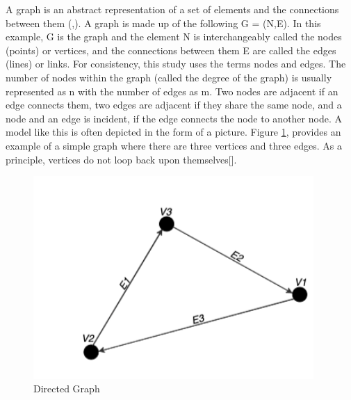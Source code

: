 A graph is an abstract representation of a set of elements and the connections between them (\cite{IntroductiontoGraphTheoryTrudeau:1994},\cite{Boeing:2017}). A graph is made up of the following G = (N,E). In this example, G is the graph and the element N is interchangeably called the nodes (points) or vertices, and the connections between them E are called the edges (lines) or links. For consistency, this study uses the terms nodes and edges. The number of nodes within the graph (called the degree of the graph) is usually represented as n with the number of edges as m. Two nodes are adjacent if an edge connects them, two edges are adjacent if they share the same node, and a node and an edge is incident, if the edge connects the node to another node. A model like this is often depicted in the form of a picture. Figure \ref{fig:directedgraph}, provides an example of a simple graph where there are three vertices and three edges. As a principle, vertices do not loop back upon themselves[\cite{Duo:2002}]. 

\begin{figure}[h]
\centering
\includegraphics[width=0.95\textwidth,center]{picture/figure5.png}
\caption[Directed Graph]{Directed Graph}
\label{fig:directedgraph}
\end{figure}


